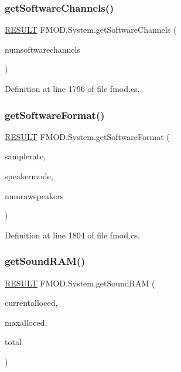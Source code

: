 \subsubsection{\texorpdfstring{get\+Software\+Channels()}{getSoftwareChannels()}}
{\footnotesize\ttfamily \hyperlink{namespace_f_m_o_d_a305d1176ef3f8c8815861a60407ac33d}{R\+E\+S\+U\+LT} F\+M\+O\+D.\+System.\+get\+Software\+Channels (\begin{DoxyParamCaption}\item[{out int}]{numsoftwarechannels }\end{DoxyParamCaption})}



Definition at line 1796 of file fmod.\+cs.

\mbox{\label{class_f_m_o_d_1_1_system_a991aa0b7999f27f24bf832aec287492f}} 
\subsubsection{\texorpdfstring{get\+Software\+Format()}{getSoftwareFormat()}}
{\footnotesize\ttfamily \hyperlink{namespace_f_m_o_d_a305d1176ef3f8c8815861a60407ac33d}{R\+E\+S\+U\+LT} F\+M\+O\+D.\+System.\+get\+Software\+Format (\begin{DoxyParamCaption}\item[{out int}]{samplerate,  }\item[{out \hyperlink{namespace_f_m_o_d_aa0732e7e8efd3b96b526a7f2f8479634}{S\+P\+E\+A\+K\+E\+R\+M\+O\+DE}}]{speakermode,  }\item[{out int}]{numrawspeakers }\end{DoxyParamCaption})}



Definition at line 1804 of file fmod.\+cs.

\mbox{\label{class_f_m_o_d_1_1_system_ac271228705f4aa0c6bbf2ed8178a9c97}} 
\subsubsection{\texorpdfstring{get\+Sound\+R\+A\+M()}{getSoundRAM()}}
{\footnotesize\ttfamily \hyperlink{namespace_f_m_o_d_a305d1176ef3f8c8815861a60407ac33d}{R\+E\+S\+U\+LT} F\+M\+O\+D.\+System.\+get\+Sound\+R\+AM (\begin{DoxyParamCaption}\item[{out int}]{currentalloced,  }\item[{out int}]{maxalloced,  }\item[{out int}]{total }\end{DoxyParamCaption})}



